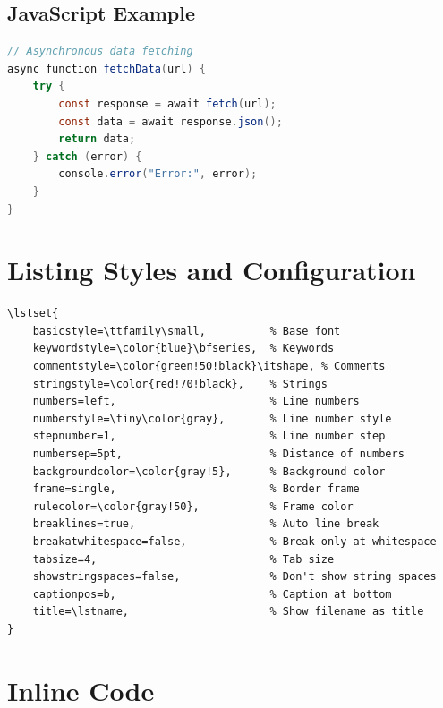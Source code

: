 \subsection{JavaScript Example}

\begin{lstlisting}[language=Java, caption=JavaScript example]
// Asynchronous data fetching
async function fetchData(url) {
    try {
        const response = await fetch(url);
        const data = await response.json();
        return data;
    } catch (error) {
        console.error("Error:", error);
    }
}
\end{lstlisting}

\section{Listing Styles and Configuration}

\begin{lstlisting}[language={[LaTeX]TeX}, caption=Listing configuration]
% Global settings in preamble:
\lstset{
    basicstyle=\ttfamily\small,          % Base font
    keywordstyle=\color{blue}\bfseries,  % Keywords
    commentstyle=\color{green!50!black}\itshape, % Comments
    stringstyle=\color{red!70!black},    % Strings
    numbers=left,                        % Line numbers
    numberstyle=\tiny\color{gray},       % Line number style
    stepnumber=1,                        % Line number step
    numbersep=5pt,                       % Distance of numbers
    backgroundcolor=\color{gray!5},      % Background color
    frame=single,                        % Border frame
    rulecolor=\color{gray!50},           % Frame color
    breaklines=true,                     % Auto line break
    breakatwhitespace=false,             % Break only at whitespace
    tabsize=4,                           % Tab size
    showstringspaces=false,              % Don't show string spaces
    captionpos=b,                        % Caption at bottom
    title=\lstname,                      % Show filename as title
}
\end{lstlisting}


\section{Inline Code}

